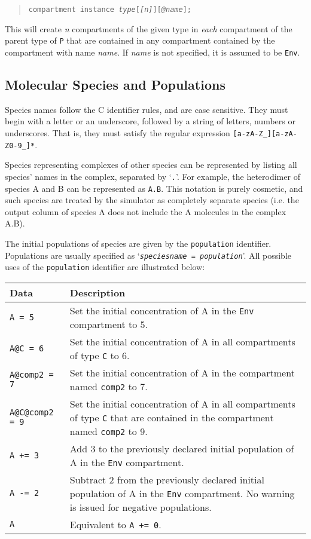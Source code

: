 \documentclass[10pt]{article}
\newcommand{\code}[1]{{\tt {#1}}}
\newcommand{\codeparam}[1]{\textrm{\textit{#1}}}
\newcommand{\optparam}[1]{\textrm{[\textit{#1}]}}
\begin{document}
\begin{quote}
\code{compartment instance \codeparam{type}\optparam{\code{[}n\code{]}}\optparam{@\codeparam{name}};}
\end{quote}

This will create \codeparam{n} compartments of the given type in \emph{each} compartment of the parent type of \code{P} that are contained in any compartment contained by the compartment with name \codeparam{name}. If \codeparam{name} is not specified, it is assumed to be \code{Env}.

\subsection{Molecular Species and Populations}
\label{sec:population}

Species names follow the C identifier rules, and are case sensitive. They must begin with a letter or an underscore, followed by a string of letters, numbers or underscores. That is, they must satisfy the regular expression \code{[a-zA-Z\_][a-zA-Z0-9\_]*}.

Species representing complexes of other species can be represented by listing all species' names in the complex, separated by `\code{.}'. For example, the heterodimer of species A and B can be represented as \code{A.B}. This notation is purely cosmetic, and such species are treated by the simulator as completely separate species (i.e. the output column of species A does not include the A molecules in the complex A.B).

The initial populations of species are given by the \code{population} identifier. Populations are usually specified as `\code{\codeparam{speciesname} = \codeparam{population}}'. All possible uses of the \code{population} identifier are illustrated below:

\begin{center}
\begin{tabular}{l|p{2.4in}}
Data&Description\\
\hline
\hline \code{A = 5}&Set the initial concentration of A in the \code{Env} compartment to 5.\\
\hline \code{A@C = 6}&Set the initial concentration of A in all compartments of type \code{C} to 6.\\
\hline \code{A@comp2 = 7}&Set the initial concentration of A in the compartment named \code{comp2} to 7.\\
\hline \code{A@C@comp2 = 9}&Set the initial concentration of A in all compartments of type \code{C} that are contained in the compartment named \code{comp2} to 9.\\
\hline \code{A += 3}&Add 3 to the previously declared initial population of A in the \code{Env} compartment.\\
\hline \code{A -= 2}&Subtract 2 from the previously declared initial population of A in the \code{Env} compartment. No warning is issued for negative populations.\\
\hline \code{A}&Equivalent to \code{A += 0}.
\end{tabular}
\end{center}
\end{document}
